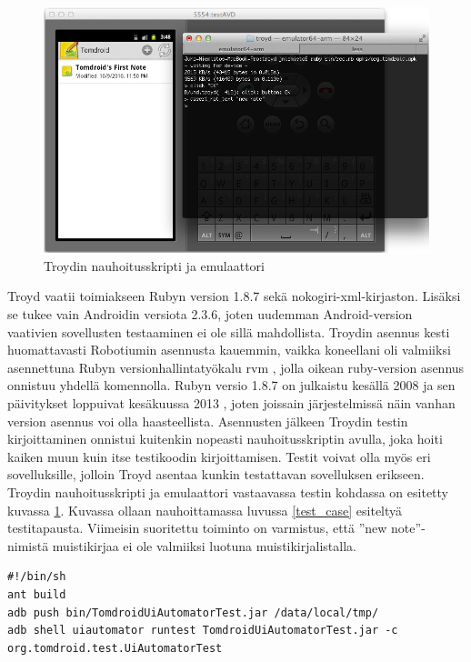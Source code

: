 \begin{figure}[h]
\centering
\includegraphics[width=148mm]{troyd.png}
\caption{Troydin nauhoitusskripti ja emulaattori} \label{troyd_run}
\end{figure}

Troyd vaatii toimiakseen Rubyn version 1.8.7 sekä nokogiri-xml-kirjaston. Lisäksi se tukee vain Androidin versiota 2.3.6, joten uudemman Android-version vaativien sovellusten testaaminen ei ole sillä mahdollista. Troydin asennus kesti huomattavasti Robotiumin asennusta kauemmin, vaikka koneellani oli valmiiksi asennettuna Rubyn versionhallintatyökalu rvm \cite{rvm}, jolla oikean ruby-version asennus onnistuu yhdellä komennolla. Rubyn versio 1.8.7 on julkaistu kesällä 2008 ja sen päivitykset loppuivat kesäkuussa 2013 \cite{ruby_187}, joten joissain järjestelmissä näin vanhan version asennus voi olla haasteellista. Asennusten jälkeen Troydin testin kirjoittaminen onnistui kuitenkin nopeasti nauhoitusskriptin avulla, joka hoiti kaiken muun kuin itse testikoodin kirjoittamisen. Testit voivat olla myös eri sovelluksille, jolloin Troyd asentaa kunkin testattavan sovelluksen erikseen. Troydin nauhoitusskripti ja emulaattori vastaavassa testin kohdassa on esitetty kuvassa \ref{troyd_run}. Kuvassa ollaan nauhoittamassa luvussa \ref{test_case} esiteltyä testitapausta. Viimeisin suoritettu toiminto on varmistus, että ''new note''-nimistä muistikirjaa ei ole valmiiksi luotuna muistikirjalistalla.

\begin{lstlisting}[float, label=uiautomator_run,caption=Uiautomator-testien ajaminen]
#!/bin/sh
ant build
adb push bin/TomdroidUiAutomatorTest.jar /data/local/tmp/
adb shell uiautomator runtest TomdroidUiAutomatorTest.jar -c org.tomdroid.test.UiAutomatorTest
\end{lstlisting}

